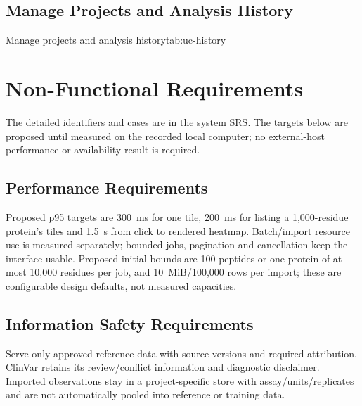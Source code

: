 \subsection{Manage Projects and Analysis History}
\begin{usecasespec}{Manage projects and analysis history}{tab:uc-history}
\end{usecasespec}

\section{Non-Functional Requirements}
The detailed identifiers and cases are in the system SRS. The targets below are proposed until measured
on the recorded local computer; no external-host performance or availability result is required.
\subsection{Performance Requirements}
Proposed p95 targets are 300~ms for one tile, 200~ms for listing a 1,000-residue protein's tiles and
1.5~s from click to rendered heatmap. Batch/import resource use is measured separately; bounded jobs,
pagination and cancellation keep the interface usable. Proposed initial bounds are 100 peptides or
one protein of at most 10,000 residues per job, and 10~MiB/100,000 rows per import; these are
configurable design defaults, not measured capacities.
\subsection{Information Safety Requirements}
Serve only approved reference data with source versions and required attribution. ClinVar retains its
review/conflict information and diagnostic disclaimer. Imported observations stay in a project-specific
store with assay/units/replicates and are not automatically pooled into reference or training data.
